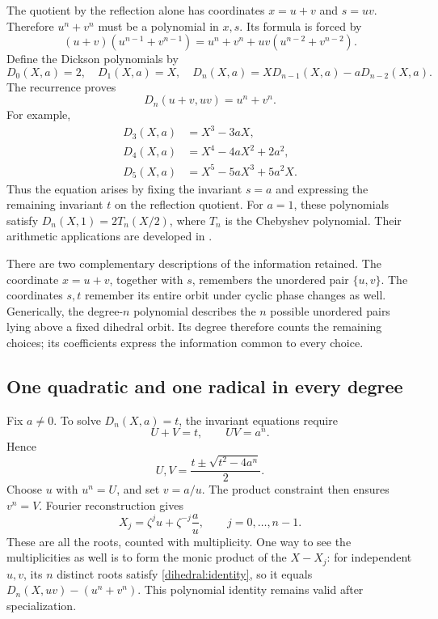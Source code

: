 \documentclass[11pt]{article}
\theoremstyle{remark}
\begin{document}
The quotient by the reflection alone has coordinates \(x=u+v\) and \(s=uv\). Therefore \(u^n+v^n\) must be a polynomial in \(x,s\). Its formula is forced by
\[
(u+v)(u^{n-1}+v^{n-1})
=u^n+v^n+uv(u^{n-2}+v^{n-2}).
\]
Define the Dickson polynomials by
\begin{equation}
D_0(X,a)=2,\quad D_1(X,a)=X,\quad
D_n(X,a)=X D_{n-1}(X,a)-aD_{n-2}(X,a).
\label{dihedral:recurrence}
\end{equation}
The recurrence proves
\begin{equation}
D_n(u+v,uv)=u^n+v^n.
\label{dihedral:identity}
\end{equation}
For example,
\begin{align*}
D_3(X,a)&=X^3-3aX,\\
D_4(X,a)&=X^4-4aX^2+2a^2,\\
D_5(X,a)&=X^5-5aX^3+5a^2X.
\end{align*}
Thus the equation arises by fixing the invariant \(s=a\) and expressing the remaining invariant \(t\) on the reflection quotient. For \(a=1\), these polynomials satisfy \(D_n(X,1)=2T_n(X/2)\), where \(T_n\) is the Chebyshev polynomial. Their arithmetic applications are developed in \cite{bluher}.

There are two complementary descriptions of the information retained. The coordinate \(x=u+v\), together with \(s\), remembers the unordered pair \(\{u,v\}\). The coordinates \(s,t\) remember its entire orbit under cyclic phase changes as well. Generically, the degree-\(n\) polynomial describes the \(n\) possible unordered pairs lying above a fixed dihedral orbit. Its degree therefore counts the remaining choices; its coefficients express the information common to every choice.

\subsection{One quadratic and one radical in every degree}

Fix \(a\ne0\). To solve \(D_n(X,a)=t\), the invariant equations require
\[
U+V=t,\qquad UV=a^n.
\]
Hence
\[
U,V=\frac{t\pm\sqrt{t^2-4a^n}}2.
\]
Choose \(u\) with \(u^n=U\), and set \(v=a/u\). The product constraint then ensures \(v^n=V\). Fourier reconstruction gives
\begin{equation}
X_j=\zeta^j u+\zeta^{-j}\frac a u,
\qquad j=0,\ldots,n-1.
\label{dihedral:roots}
\end{equation}
These are all the roots, counted with multiplicity. One way to see the multiplicities as well is to form the monic product of the \(X-X_j\): for independent \(u,v\), its \(n\) distinct roots satisfy \eqref{dihedral:identity}, so it equals \(D_n(X,uv)-(u^n+v^n)\). This polynomial identity remains valid after specialization.
\end{document}
